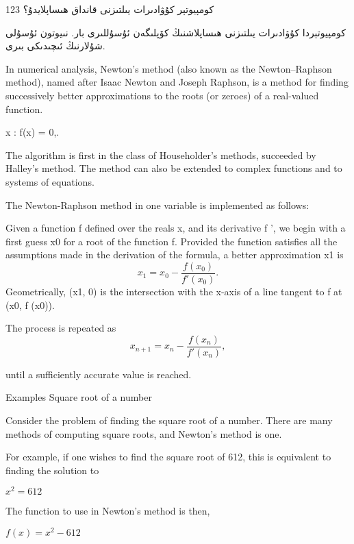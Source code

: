 \documentclass[24]{article}
\begin{document}
\textarabic{كومپيوتېر كۇۋادىرات يىلتىزنى قانداق ھىساپلايدۇ؟ 123}

\newfontfamily{}%
\begin{Arabic}

كومپيوتېردا كۇۋادىرات يىلتىزنى ھىساپلاشنىڭ كۆپلىگەن ئۇسۇللىرى بار. نىيوتون ئۇسۇلى شۇلارنىڭ ئىچىدىكى بىرى. 
\end{Arabic}

In numerical analysis, Newton's method (also known as the Newton–Raphson method), named after Isaac Newton and Joseph Raphson, is a method for finding successively better approximations to the roots (or zeroes) of a real-valued function.

    x : f(x) = 0,.

The algorithm is first in the class of Householder's methods, succeeded by Halley's method. The method can also be extended to complex functions and to systems of equations.

The Newton-Raphson method in one variable is implemented as follows:

Given a function ƒ defined over the reals x, and its derivative ƒ ', we begin with a first guess x0 for a root of the function f. Provided the function satisfies all the assumptions made in the derivation of the formula, a better approximation x1 is
\begin{equation}
    x_{1} = x_0 - \frac{f(x_0)}{f'(x_0)}.
\end{equation}
Geometrically, (x1, 0) is the intersection with the x-axis of a line tangent to f at (x0, f (x0)).

The process is repeated as
\begin{equation}
    x_{n+1} = x_n - \frac{f(x_n)}{f'(x_n)} ,
\end{equation}

until a sufficiently accurate value is reached.


Examples
Square root of a number

Consider the problem of finding the square root of a number. There are many methods of computing square roots, and Newton's method is one.

For example, if one wishes to find the square root of 612, this is equivalent to finding the solution to

$    x^2 = 612$

The function to use in Newton's method is then,

   $ f(x) = x^2 - 612$
\end{document}
